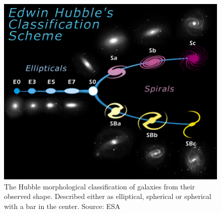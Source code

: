 
\begin{figure}
  \centering
  \includegraphics[width=\figwidth]{img/HubbleTuningFork.jpg}
  \caption[Hubble morphological classification of galaxies]{\label{img:HubbleTuningFork}
    The Hubble morphological classification of galaxies from their observed shape. Described either as elliptical, spherical or spherical with a bar in the center.
    Source: ESA
  }
\end{figure}
